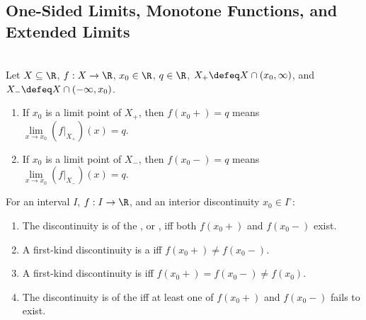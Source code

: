 \subsection{One-Sided Limits, Monotone Functions, and Extended Limits}

\begin{definition} \label{def:one-sided-limits-and-discontinuities} \\
Let $X\subseteq\R$, $f:X\to\R$, $x_0\in\R$, $q\in\R$, $X_+\defeq X\cap(x_0,\infty)$, and $X_-\defeq X\cap(-\infty,x_0)$.
\begin{enumerate}[label=(\roman*)]
\setlength{\itemsep}{0pt}
\item If $x_0$ is a limit point of $X_+$, then $f(x_0+)=q$ means $\lim\limits_{x\to x_0}(f|_{X_+})(x)=q$.
\item If $x_0$ is a limit point of $X_-$, then $f(x_0-)=q$ means $\lim\limits_{x\to x_0}(f|_{X_-})(x)=q$.
\end{enumerate}
For an interval $I$, $f:I\to\R$, and an interior discontinuity $x_0\in I^\circ$:
\begin{enumerate}[label=(\roman*)]
\setlength{\itemsep}{0pt}
\item The discontinuity is of the , or , iff both $f(x_0+)$ and $f(x_0-)$ exist.
\item A first-kind discontinuity is a  iff $f(x_0+)\neq f(x_0-)$.
\item A first-kind discontinuity is  iff $f(x_0+)=f(x_0-)\neq f(x_0)$.
\item The discontinuity is of the  iff at least one of $f(x_0+)$ and $f(x_0-)$ fails to exist.
\end{enumerate}
\end{definition}

